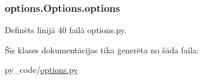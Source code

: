 \subsubsection[{\texorpdfstring{options}{options}}]{\setlength{\rightskip}{0pt plus 5cm}options.\+Options.\+options}\hypertarget{classoptions_1_1_options_a9c41aa8b6baa3a4f7cf9817d2aea2fa1}{}\label{classoptions_1_1_options_a9c41aa8b6baa3a4f7cf9817d2aea2fa1}


Definēts līnijā 40 failā options.\+py.



Šīs klases dokumentācijas tika ģenerēta no šāda faila\+:\begin{DoxyCompactItemize}
\item 
py\+\_\+code/\hyperlink{options_8py}{options.\+py}\end{DoxyCompactItemize}
